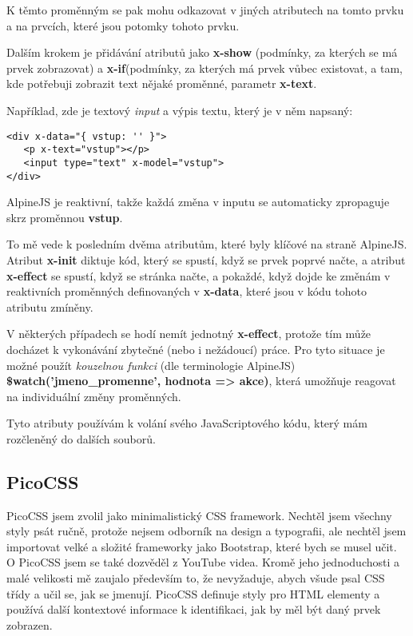 \documentclass[11pt,a4paper,twoside,openright]{report}
\begin{document}
K těmto proměnným se pak mohu odkazovat v jiných atributech na tomto prvku a na prvcích, které jsou
potomky tohoto prvku.

Dalším krokem je přidávání atributů jako \textbf{x-show} (podmínky, za kterých se má prvek zobrazovat)
a \textbf{x-if}(podmínky, za kterých má prvek vůbec existovat, a tam, kde potřebuji zobrazit text
nějaké proměnné, parametr \textbf{x-text}.

Například, zde je textový \emph{input} a výpis textu, který je v něm napsaný:

\begin{verbatim}
<div x-data="{ vstup: '' }">
   <p x-text="vstup"></p>
   <input type="text" x-model="vstup">
</div>
\end{verbatim}

AlpineJS je reaktivní, takže každá změna v inputu se automaticky zpropaguje skrz proměnnou \textbf{vstup}.

To mě vede k posledním dvěma atributům, které byly klíčové na straně AlpineJS. Atribut \textbf{x-init}
diktuje kód, který se spustí, když se prvek poprvé načte, a atribut \textbf{x-effect} se spustí, když
se stránka načte, a pokaždé, když dojde ke změnám v reaktivních proměnných definovaných v \textbf{x-data},
které jsou v kódu tohoto atributu zmíněny.

V některých případech se hodí nemít jednotný \textbf{x-effect}, protože tím může docházet k vykonávání
zbytečné (nebo i nežádoucí) práce. Pro tyto situace je možné použít \emph{kouzelnou funkci} (dle terminologie
AlpineJS) \textbf{\$watch('jmeno\_promenne', hodnota => akce)}, která umožňuje reagovat na individuální
změny proměnných.

Tyto atributy používám k volání svého JavaScriptového kódu, který mám rozčleněný do dalších souborů.

\subsection{PicoCSS}

PicoCSS jsem zvolil jako minimalistický CSS framework. Nechtěl jsem všechny styly psát ručně, protože
nejsem odborník na design a typografii, ale nechtěl jsem importovat velké a složité frameworky jako
Bootstrap, které bych se musel učit. O PicoCSS jsem se také dozvěděl z YouTube videa. Kromě jeho jednoduchosti
a malé velikosti mě zaujalo především to, že nevyžaduje, abych všude psal CSS třídy a učil se, jak se
jmenují. PicoCSS definuje styly pro HTML elementy a používá další kontextové informace k identifikaci,
jak by měl být daný prvek zobrazen.
\end{document}
